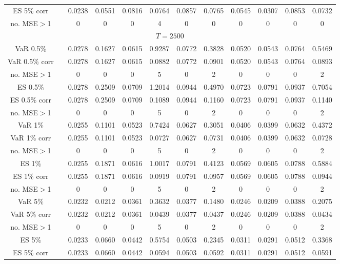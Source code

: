 {{\begin{sidewaystable}
\begin{tabular}{cc cc | cccc | cccc}
ES 5\% corr && 0.0238 & 0.0551 & 0.0816 & 0.0764 & 0.0857 & 0.0765 &0.0545 & 0.0307 & 0.0853 & 0.0732 \\ 
no. MSE$>$1 && 0 & 0 & 0 & 4 & 0 & 0 &0 & 0 & 0 & 0 \\[1ex] 
\hline 
\multicolumn{12}{c}{$T =2500$}  \\ 
\hline 
VaR 0.5\% && 0.0278 & 0.1627 & 0.0615 & 0.9287 & 0.0772 & 0.3828 &0.0520 & 0.0543 & 0.0764 & 0.5469 \\ 
VaR 0.5\% corr && 0.0278 & 0.1627 & 0.0615 & 0.0882 & 0.0772 & 0.0901 &0.0520 & 0.0543 & 0.0764 & 0.0893 \\ 
no. MSE$>$1 && 0 & 0 & 0 & 5 & 0 & 2 &0 & 0 & 0 & 2 \\[1ex] 
ES 0.5\% && 0.0278 & 0.2509 & 0.0709 & 1.2014 & 0.0944 & 0.4970 &0.0723 & 0.0791 & 0.0937 & 0.7054 \\ 
ES 0.5\% corr && 0.0278 & 0.2509 & 0.0709 & 0.1089 & 0.0944 & 0.1160 &0.0723 & 0.0791 & 0.0937 & 0.1140 \\ 
no. MSE$>$1 && 0 & 0 & 0 & 5 & 0 & 2 &0 & 0 & 0 & 2 \\[1.5ex]  
 \rowcolor{LightCyan} 
VaR 1\% && 0.0255 & 0.1101 & 0.0523 & 0.7424 & 0.0627 & 0.3051 &0.0406 & 0.0399 & 0.0632 & 0.4372 \\  
 \rowcolor{LightCyan} 
VaR 1\% corr && 0.0255 & 0.1101 & 0.0523 & 0.0727 & 0.0627 & 0.0731 &0.0406 & 0.0399 & 0.0632 & 0.0728 \\ 
 \rowcolor{LightCyan} 
no. MSE$>$1 && 0 & 0 & 0 & 5 & 0 & 2 &0 & 0 & 0 & 2 \\[1ex] 
 \rowcolor{LightCyan} 
ES 1\% && 0.0255 & 0.1871 & 0.0616 & 1.0017 & 0.0791 & 0.4123 &0.0569 & 0.0605 & 0.0788 & 0.5884 \\ 
 \rowcolor{LightCyan} 
ES 1\% corr && 0.0255 & 0.1871 & 0.0616 & 0.0919 & 0.0791 & 0.0957 &0.0569 & 0.0605 & 0.0788 & 0.0944 \\ 
 \rowcolor{LightCyan} 
no. MSE$>$1 && 0 & 0 & 0 & 5 & 0 & 2 &0 & 0 & 0 & 2 \\[1.5ex] 
VaR 5\% && 0.0232 & 0.0212 & 0.0361 & 0.3632 & 0.0377 & 0.1480 &0.0246 & 0.0209 & 0.0388 & 0.2075 \\ 
VaR 5\% corr && 0.0232 & 0.0212 & 0.0361 & 0.0439 & 0.0377 & 0.0437 &0.0246 & 0.0209 & 0.0388 & 0.0434 \\ 
no. MSE$>$1 && 0 & 0 & 0 & 5 & 0 & 2 &0 & 0 & 0 & 2 \\[1ex] 
ES 5\% && 0.0233 & 0.0660 & 0.0442 & 0.5754 & 0.0503 & 0.2345 &0.0311 & 0.0291 & 0.0512 & 0.3368 \\ 
ES 5\% corr && 0.0233 & 0.0660 & 0.0442 & 0.0594 & 0.0503 & 0.0592 &0.0311 & 0.0291 & 0.0512 & 0.0591 \\ 

\end{tabular}
\end{sidewaystable}}}
